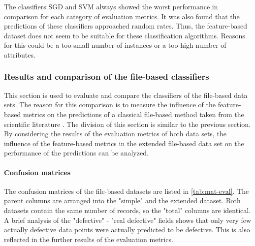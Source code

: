 The classifiers SGD and SVM always showed the worst performance in comparison for each category of evaluation metrics. It was also found that the predictions of these classifiers approached random rates. Thus, the feature-based dataset does not seem to be suitable for these classification algorithms. Reasons for this could be a too small number of instances or a too high number of attributes.

\subsubsection*{Results and comparison of the file-based classifiers}

This section is used to evaluate and compare the classifiers of the file-based data sets. The reason for this comparison is to measure the influence of the feature-based metrics on the predictions of a classical file-based method taken from the scientific literature \cite{Moser2008}. The division of this section is similar to the previous section. By considering the results of the evaluation metrics of both data sets, the influence of the feature-based metrics in the extended file-based data set on the performance of the predictions can be analyzed. 

\paragraph{Confusion matrices}

The confusion matrices of the file-based datasets are listed in \autoref{tab:mat-eval}. The parent columns are arranged into the "simple" and the extended dataset. Both datasets contain the same number of records, so the "total" columns are identical. A brief analysis of the "defective" - "real defective" fields shows that only very few actually defective data points were actually predicted to be defective. This is also reflected in the further results of the evaluation metrics.

